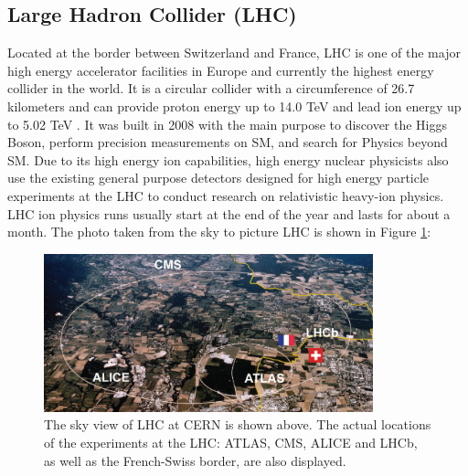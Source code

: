 
\subsection{Large Hadron Collider (LHC)} 

Located at the border between Switzerland and France, LHC is one of the major high energy accelerator facilities in Europe and currently the highest energy collider in the world. It is a circular collider with a circumference of 26.7 kilometers and can provide proton energy up to 14.0 TeV and lead ion energy up to 5.02 TeV \cite{LHCReport}. It was built in 2008 with the main purpose to discover the Higgs Boson, perform precision measurements on SM, and search for Physics beyond SM. Due to its high energy ion capabilities, high energy nuclear physicists also use the existing general purpose detectors designed for high energy particle experiments at the LHC to conduct research on relativistic heavy-ion physics. LHC ion physics runs usually start at the end of the year and lasts for about a month. The photo taken from the sky to picture LHC is shown in Figure \ref{LHC}:

\begin{figure}[hbtp]
\begin{center}
\includegraphics[width=0.85\textwidth]{Figures/Chapter1/LHC.png}
\caption{The sky view of LHC at CERN is shown above. The actual locations of the experiments at the LHC: ATLAS, CMS, ALICE and LHCb, as well as the French-Swiss border, are also displayed.}
\label{LHC}
\end{center}
\end{figure} 

